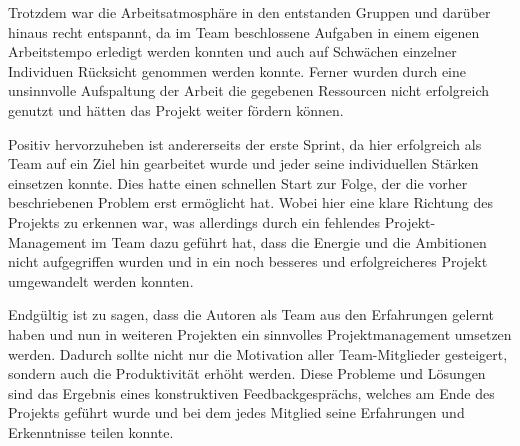 Trotzdem war die Arbeitsatmosphäre in den entstanden Gruppen und darüber hinaus recht entspannt, da im Team beschlossene Aufgaben in einem eigenen Arbeitstempo erledigt werden konnten und auch auf Schwächen einzelner Individuen Rücksicht genommen werden konnte.
Ferner wurden durch eine unsinnvolle Aufspaltung der Arbeit die gegebenen Ressourcen nicht erfolgreich genutzt und hätten das Projekt weiter fördern können.

Positiv hervorzuheben ist andererseits der erste Sprint, da hier erfolgreich als Team auf ein Ziel hin gearbeitet wurde und jeder seine individuellen Stärken einsetzen konnte.
Dies hatte einen schnellen Start zur Folge, der die vorher beschriebenen Problem erst ermöglicht hat.
Wobei hier eine klare Richtung des Projekts zu erkennen war, was allerdings durch ein fehlendes Projekt-Management im Team dazu geführt hat, dass die Energie und die Ambitionen nicht aufgegriffen wurden und in ein noch besseres und erfolgreicheres Projekt umgewandelt werden konnten.

Endgültig ist zu sagen, dass die Autoren als Team aus den Erfahrungen gelernt haben und nun in weiteren Projekten ein sinnvolles Projektmanagement umsetzen werden.
Dadurch sollte nicht nur die Motivation aller Team-Mitglieder gesteigert, sondern auch die Produktivität erhöht werden.
Diese Probleme und Lösungen sind das Ergebnis eines konstruktiven Feedbackgesprächs, welches am Ende des Projekts geführt wurde und bei dem jedes Mitglied seine Erfahrungen und Erkenntnisse teilen konnte.
